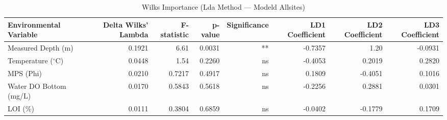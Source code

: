 \begin{table}[htbp]
  \centering
  \caption{Wilks Importance (Lda Method — Modeld Allsites)}
  \label{tab:LDA_Method_ModelD_AllSites_tables_wilks_importance}
  \small
  \begin{tabular}{lrrrrrrr}
    \toprule
    Environmental Variable & Delta Wilks' Lambda & F-statistic & p-value & Significance & LD1 Coefficient & LD2 Coefficient & LD3 Coefficient \\
    \midrule
    Measured Depth (m) & 0.1921 & 6.61 & 0.0031 & ** & -0.7357 & 1.20 & -0.0931 \\
    Temperature ($^{\circ}$C) & 0.0448 & 1.54 & 0.2260 & ns & -0.4053 & 0.2019 & 0.2820 \\
    MPS (Phi) & 0.0210 & 0.7217 & 0.4917 & ns & 0.1809 & -0.4051 & 0.1016 \\
    Water DO Bottom (mg/L) & 0.0170 & 0.5843 & 0.5618 & ns & -0.2256 & 0.2881 & 0.0301 \\
    LOI (\%) & 0.0111 & 0.3804 & 0.6859 & ns & -0.0402 & -0.1779 & 0.1709 \\
    \bottomrule
  \end{tabular}
\end{table}
